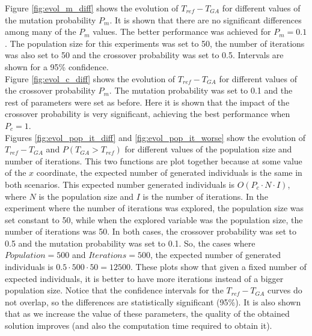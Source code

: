 \documentclass[10pt,a4paper]{article}
\begin{document}
Figure \ref{fig:evol_m_diff} shows the evolution of $T_{ref} - T_{GA}$ for different values of the mutation probability $P_m$. It is shown that there are no significant differences among many of the $P_m$ values. The better performance was achieved for $P_m = 0.1$. The population size for this experiments was set to 50, the number of iterations was also set to 50 and the crossover probability was set to 0.5. Intervals are shown for a 95\% confidence.\\

Figure \ref{fig:evol_c_diff} shows the evolution of $T_{ref} - T_{GA}$ for different values of the crossover probability $P_m$. The mutation probability was set to 0.1 and the rest of parameters were set as before. Here it is shown that the impact of the crossover probability is very significant, achieving the best performance when $P_c = 1$.\\

Figures \ref{fig:evol_pop_it_diff} and \ref{fig:evol_pop_it_worse} show the evolution of $T_{ref} - T_{GA}$ and $P(T_{GA} > T_{ref})$ for different values of the population size and number of iterations. This two functions are plot together because at some value of the $x$ coordinate, the expected number of generated individuals is the same in both scenarios. This expected number generated individuals is $O(P_c \cdot N \cdot I)$, where $N$ is the population size and $I$ is the number of iterations. In the experiment where the number of iterations was explored, the population size was set constant to 50, while when the explored variable was the population size, the number of iterations was 50. In both cases, the crossover probability was set to 0.5 and the mutation probability was set to 0.1. So, the cases where $Population = 500$ and $Iterations = 500$, the expected number of generated individuals is $0.5 \cdot 500 \cdot 50 = 12500$. These plots show that given a fixed number of expected individuals, it is better to have more iterations instead of a bigger population size. Notice that the confidence intervals for the $T_{ref} - T_{GA}$ curves do not overlap, so the differences are statistically significant (95\%). It is also shown that as we increase the value of these parameters, the quality of the obtained solution improves (and also the computation time required to obtain it).\\
\end{document}
